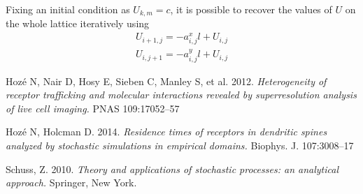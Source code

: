 \documentclass[a4paper]{article}
\begin{document}
Fixing an initial condition as $U_{k,m} = c$, it is possible to recover the values of $U$ on the whole lattice iteratively using
\begin{align}
U_{i+1,j} = -a^x_{i,j}l + U_{i,j} \\[10pt]
U_{i,j+1} = -a^y_{i,j}l + U_{i,j}
\end{align}

\clearpage

\begin{thebibliography}{9}
Hoz\'e N, Nair D, Hosy E, Sieben C, Manley S, et al. 2012. \textit{Heterogeneity of receptor trafficking and molecular interactions revealed by superresolution analysis of live cell imaging.} PNAS 109:17052–57

Hoz\'e N, Holcman D. 2014. \textit{Residence times of receptors in dendritic spines analyzed by stochastic simulations in empirical domains.} Biophys. J. 107:3008–17

Schuss, Z. 2010. \textit{Theory and applications of stochastic processes: an analytical approach.} Springer, New York.

\end{thebibliography}
\end{document}
